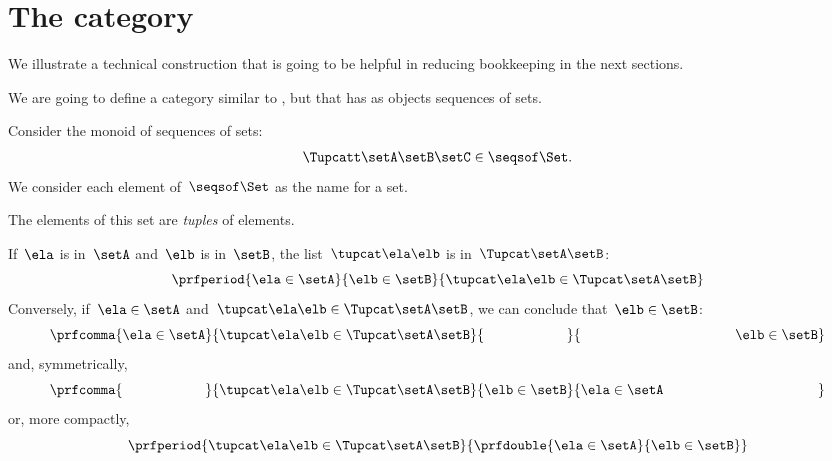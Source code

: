 \section{The \SetL category}
\label{sec:SetL}

We illustrate a technical construction that is going to be helpful in reducing bookkeeping in the next sections.

We are going to define a category similar to \Set, but that has as objects sequences of sets.

Consider the monoid of sequences of sets:
%
\begin{equation}
    \label{eq:sets-monoid}
    \Tupcatt \setA  \setB  \setC \in \seqsof\Set.
\end{equation}
%
We consider each element of~$\seqsof\Set$ as the name for a set.

The elements of this set are \emph{tuples} of elements.

If~$\ela$ is in~$\setA$ and~$\elb$ is in~$\setB$, the list~$\tupcat \ela \elb$ is in~$\Tupcat \setA \setB$:
%
\begin{equation}
    \label{eq:sets-monoid-axiom1}
    \prfperiod{
        \ela \in \setA
    }{
        \elb \in \setB
    }{
        \tupcat \ela \elb \in \Tupcat \setA \setB
    }
\end{equation}
%
Conversely, if~$\ela \in \setA$ and~$\tupcat \ela \elb \in \Tupcat \setA \setB$, we can conclude that~$\elb \in \setB$:
%
\begin{equation}
    \label{eq:sets-monoid-axiom2}
    \prfcomma{
        \ela \in \setA
    }{
        \tupcat \ela \elb \in \Tupcat \setA  \setB
    }{
        \phantom{\elb \in \setB}
    }{
        \rule{39mm}{0pt} \elb \in  \setB
    }
\end{equation}
%
and, symmetrically,
%
\begin{equation}
    \label{eq:sets-monoid-axiom3}
    \prfcomma{
        \phantom{\ela \in \setA}
    }{
        \tupcat \ela \elb \in \Tupcat \setA \setB
    }{
        \elb \in \setB
    }{
        \ela \in  \setA \rule{39mm}{0pt}
    }
\end{equation}
%
or, more compactly,
%
\begin{equation}
    \label{eq:sets-monoid-axiom3bis}
    \prfperiod{
        \tupcat \ela \elb \in \Tupcat \setA \setB
    }{
        \prfdouble{
            \ela \in \setA
        }{
            \elb \in \setB
        }
    }
\end{equation}
%

